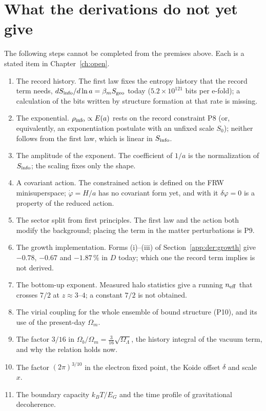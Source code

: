 \section{What the derivations do not yet give}\label{app:der:open}
The following steps cannot be completed from the premises above. Each is a stated item in Chapter~\ref{ch:open}.
\begin{enumerate}
\item The record history. The first law fixes the entropy history that the record term needs, $dS_{\rm info}/d\ln a=\beta_mS_{\rm geo}$ today
($5.2\times10^{121}$ bits per e-fold); a calculation of the bits written by structure formation at that rate is missing. \openprob
\item The exponential. $\rho_{\rm info}\propto E(a)$ rests on the record constraint P8 (or, equivalently, an exponentiation postulate with an unfixed
scale $S_0$); neither follows from the first law, which is linear in $S_{\rm info}$. \openprob
\item The amplitude of the exponent. The coefficient of $1/a$ is the normalization of $S_{\rm info}$; the scaling fixes only the shape. \openprob
\item A covariant action. The constrained action is defined on the FRW minisuperspace; $\dot\varphi=H/a$ has no covariant form yet, and with it
$\delta\varphi=0$ is a property of the reduced action. \openprob
\item The sector split from first principles. The first law and the action both modify the background; placing the term in the matter perturbations
is P9. \openprob
\item The growth implementation. Forms (i)--(iii) of Section~\ref{app:der:growth} give $-0.78$, $-0.67$ and $-1.87\,\%$ in $D$ today; which one the
record term implies is not derived. \openprob
\item The bottom-up exponent. Measured halo statistics give a running $n_{\rm eff}$ that crosses $7/2$ at $z\approx3$--$4$; a constant $7/2$ is not
obtained. \openprob
\item The virial coupling for the whole ensemble of bound structure (P10), and its use of the present-day $\Omega_m$. \openprob
\item The factor $3/16$ in $\Omega_b/\Omega_m=\tfrac3{16}\sqrt{\Omega_\Lambda}$, the history integral of the vacuum term, and why the relation holds now. \openprob
\item The factor $(2\pi)^{3/10}$ in the electron fixed point, the Koide offset $\delta$ and scale $x$. \openprob
\item The boundary capacity $k_BT/E_G$ and the time profile of gravitational decoherence. \openprob
\end{enumerate}
